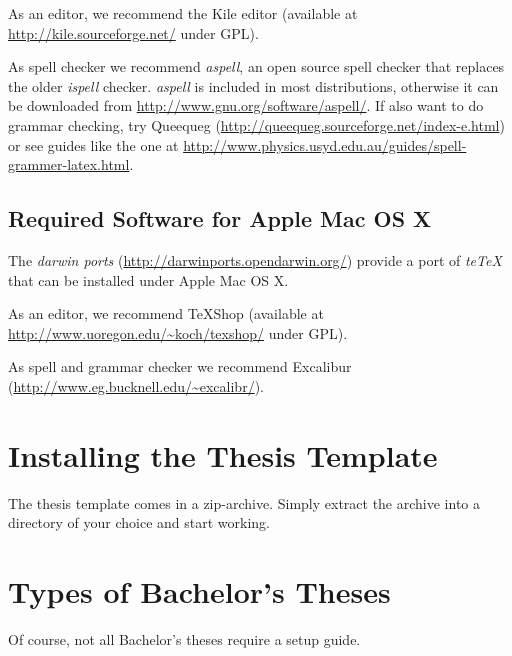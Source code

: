 As an editor, we recommend the Kile editor (available at
\url{http://kile.sourceforge.net/} under \ac{GPL}).

As spell checker we recommend \emph{aspell}, an open source spell
checker that replaces the older \emph{ispell} checker. \emph{aspell}
is included in most distributions, otherwise it can be downloaded
from \url{http://www.gnu.org/software/aspell/}. If also want to do
 grammar checking, try Queequeg
(\url{http://queequeg.sourceforge.net/index-e.html}) or see guides
like the one at
\url{http://www.physics.usyd.edu.au/guides/spell-grammer-latex.html}.

\subsection{Required Software for Apple Mac OS X}

The \emph{darwin ports} (\url{http://darwinports.opendarwin.org/})
provide a port of \emph{teTeX} that can be installed under Apple Mac
OS X.

As an editor, we recommend TeXShop (available at
\url{http://www.uoregon.edu/~koch/texshop/} under \ac{GPL}).

As spell and grammar checker we recommend Excalibur
(\url{http://www.eg.bucknell.edu/~excalibr/}).

\section{Installing the Thesis Template}

The thesis template comes in a zip-archive. Simply extract the
archive into a directory of your choice and start working.

\section{Types of Bachelor's Theses}

Of course, not all Bachelor's theses require a setup guide.

